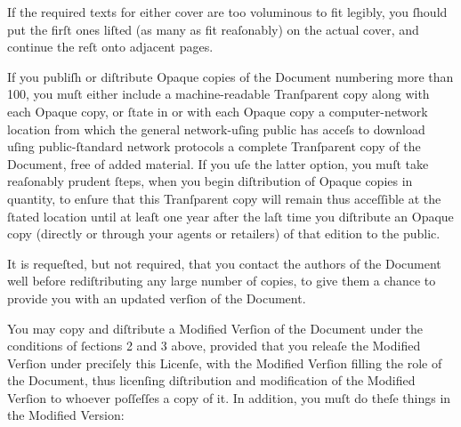 If the required texts for either cover are too voluminous to fit
legibly, you ſhould put the firſt ones liſted (as many as fit
reaſonably) on the actual cover, and continue the reſt onto adjacent
pages.

If you publiſh or diſtribute Opaque copies of the Document numbering
more than 100, you muſt either include a machine-readable Tranſparent
copy along with each Opaque copy, or ſtate in or with each Opaque copy
a computer-network location from which the general network-uſing
public has acceſs to download uſing public-ſtandard network protocols
a complete Tranſparent copy of the Document, free of added material.
If you uſe the latter option, you muſt take reaſonably prudent ſteps,
when you begin diſtribution of Opaque copies in quantity, to enſure
that this Tranſparent copy will remain thus acceſſible at the ſtated
location until at leaſt one year after the laſt time you diſtribute an
Opaque copy (directly or through your agents or retailers) of that
edition to the public.

It is requeſted, but not required, that you contact the authors of the
Document well before rediſtributing any large number of copies, to
give them a chance to provide you with an updated verſion of the
Document.


You may copy and diſtribute a Modified Verſion of the Document under
the conditions of ſections 2 and 3 above, provided that you releaſe
the Modified Verſion under preciſely this Licenſe, with the Modified
Verſion filling the role of the Document, thus licenſing diſtribution
and modification of the Modified Verſion to whoever poſſeſſes a copy
of it. In addition, you muſt do theſe things in the Modified Version:

